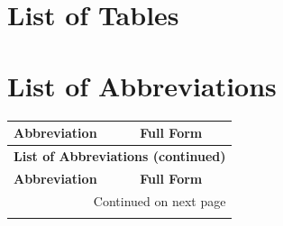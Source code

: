 \documentclass[stu,12pt,floatsintext,donotrepeattitle]{apa7}
\begin{document}
\clearpage
\begingroup
\titlespacing*{\section}{0pt}{0pt}{6pt}
\section*{List of Tables}
\renewcommand{\listtablename}{}
\listoftables
\endgroup

\clearpage
\section*{List of Abbreviations}

\begin{longtable}{p{3cm} p{10cm}}
\toprule
\textbf{Abbreviation} & \textbf{Full Form} \\
\midrule
\endfirsthead

\multicolumn{2}{c}{{\bfseries List of Abbreviations (continued)}} \\
\toprule
\textbf{Abbreviation} & \textbf{Full Form} \\
\midrule
\endhead

\bottomrule
\multicolumn{2}{r}{{Continued on next page}} \\
\endfoot

\bottomrule
\endlastfoot


\end{longtable}
\end{document}
